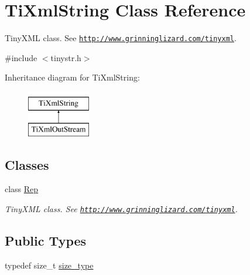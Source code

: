 \hypertarget{class_ti_xml_string}{}\section{Ti\+Xml\+String Class Reference}
\label{class_ti_xml_string}


Tiny\+X\+ML class. See \href{http://www.grinninglizard.com/tinyxml}{\tt http\+://www.\+grinninglizard.\+com/tinyxml}.  




{\ttfamily \#include $<$tinystr.\+h$>$}

Inheritance diagram for Ti\+Xml\+String\+:\begin{figure}[H]
\begin{center}
\leavevmode
\includegraphics[height=2.000000cm]{class_ti_xml_string}
\end{center}
\end{figure}
\subsection*{Classes}
\begin{DoxyCompactItemize}
\item 
class \hyperlink{struct_ti_xml_string_1_1_rep}{Rep}
\begin{DoxyCompactList}\small\item\em Tiny\+X\+ML class. See \href{http://www.grinninglizard.com/tinyxml}{\tt http\+://www.\+grinninglizard.\+com/tinyxml}. \end{DoxyCompactList}\end{DoxyCompactItemize}
\subsection*{Public Types}
\begin{DoxyCompactItemize}
\item 
typedef size\+\_\+t \hyperlink{class_ti_xml_string_abeb2c1893a04c17904f7c06546d0b971}{size\+\_\+type}
\end{DoxyCompactItemize}
